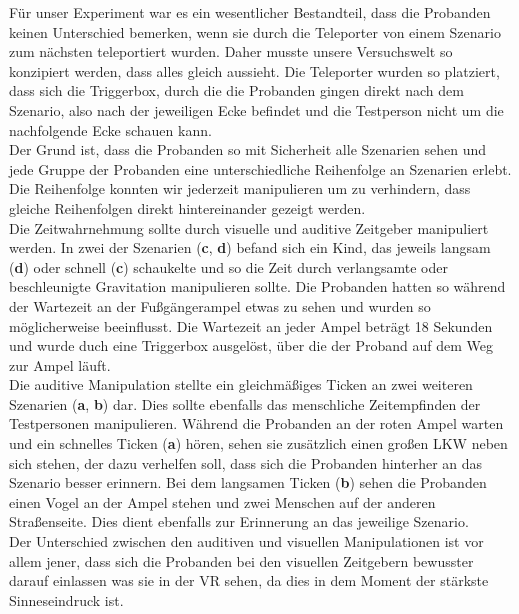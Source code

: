 \documentclass{Paper}
\begin{document}
Für unser Experiment war es ein wesentlicher Bestandteil, dass die Probanden keinen Unterschied bemerken, wenn sie durch die Teleporter von einem Szenario zum nächsten teleportiert wurden. Daher musste unsere Versuchswelt so konzipiert werden, dass alles gleich aussieht. Die Teleporter wurden so platziert, dass sich die Triggerbox, durch die die Probanden gingen direkt nach dem Szenario, also nach der jeweiligen Ecke befindet und die Testperson nicht um die nachfolgende Ecke schauen kann.\\
Der Grund ist, dass die Probanden so mit Sicherheit alle Szenarien sehen und jede Gruppe der Probanden eine unterschiedliche Reihenfolge an Szenarien erlebt. Die Reihenfolge konnten wir jederzeit manipulieren um zu verhindern, dass gleiche Reihenfolgen direkt hintereinander gezeigt werden.\\
Die Zeitwahrnehmung sollte durch visuelle und auditive Zeitgeber manipuliert werden. In zwei der Szenarien (\textbf{c}, \textbf{d}) befand sich ein Kind, das jeweils langsam  (\textbf{d}) oder schnell (\textbf{c}) schaukelte und so die Zeit durch verlangsamte oder beschleunigte Gravitation manipulieren sollte. Die Probanden hatten so während der Wartezeit an der Fußgängerampel etwas zu sehen und wurden so möglicherweise beeinflusst. Die Wartezeit an jeder Ampel beträgt 18 Sekunden und wurde duch eine Triggerbox ausgelöst, über die der Proband auf dem Weg zur Ampel läuft. \\
Die auditive Manipulation stellte ein gleichmäßiges Ticken an zwei weiteren Szenarien (\textbf{a}, \textbf{b}) dar. Dies sollte ebenfalls das menschliche Zeitempfinden der Testpersonen manipulieren. Während die Probanden an der roten Ampel warten und ein schnelles Ticken (\textbf{a}) hören, sehen sie zusätzlich einen großen LKW neben sich stehen, der dazu verhelfen soll, dass sich die Probanden hinterher an das Szenario besser erinnern.
Bei dem langsamen Ticken (\textbf{b}) sehen die Probanden einen Vogel an der Ampel stehen und zwei Menschen auf der anderen Straßenseite. Dies dient ebenfalls zur Erinnerung an das jeweilige Szenario.  \\
Der Unterschied zwischen den auditiven und visuellen Manipulationen ist vor allem jener, dass sich die Probanden bei den visuellen Zeitgebern bewusster darauf einlassen was sie in der VR sehen, da dies in dem Moment der stärkste Sinneseindruck ist.\\
\end{document}
